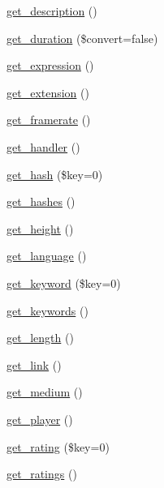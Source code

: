 \begin{DoxyCompactItemize}
\item 
\hyperlink{class_simple_pie___enclosure_abc502740b7d87d45d352ea2155667c78}{get\-\_\-description} ()
\item 
\hyperlink{class_simple_pie___enclosure_ab144c0c8ef5a4f78a343f3d436d50762}{get\-\_\-duration} (\$convert=false)
\item 
\hyperlink{class_simple_pie___enclosure_a4b640b047bf716db46b2cece32cfcf62}{get\-\_\-expression} ()
\item 
\hyperlink{class_simple_pie___enclosure_acf7e73ec3366ee8a8d4b223441837088}{get\-\_\-extension} ()
\item 
\hyperlink{class_simple_pie___enclosure_a68fde4879f5f208e7df68a165751a015}{get\-\_\-framerate} ()
\item 
\hyperlink{class_simple_pie___enclosure_ab00e7fa2386b201f2536441250da52db}{get\-\_\-handler} ()
\item 
\hyperlink{class_simple_pie___enclosure_aaab506eee67090b84410f648374572e3}{get\-\_\-hash} (\$key=0)
\item 
\hyperlink{class_simple_pie___enclosure_ad0ee7ea83fe108685560e77b87b61477}{get\-\_\-hashes} ()
\item 
\hyperlink{class_simple_pie___enclosure_a5af6b6ffc9d0d92e40bb4583d417232d}{get\-\_\-height} ()
\item 
\hyperlink{class_simple_pie___enclosure_a52e77af9a324c369cad1d69fd6a28251}{get\-\_\-language} ()
\item 
\hyperlink{class_simple_pie___enclosure_a10175514c2e4036b96b97f14db176919}{get\-\_\-keyword} (\$key=0)
\item 
\hyperlink{class_simple_pie___enclosure_a35b1c19b519145bdf80c9fc56c3cd3b3}{get\-\_\-keywords} ()
\item 
\hyperlink{class_simple_pie___enclosure_ac6a59eab49c56cb89f9c940b9fafb423}{get\-\_\-length} ()
\item 
\hyperlink{class_simple_pie___enclosure_aa0cc580fcb4ee20268343498661427fd}{get\-\_\-link} ()
\item 
\hyperlink{class_simple_pie___enclosure_ac35df32de819e5dcbf909ef5ce620da6}{get\-\_\-medium} ()
\item 
\hyperlink{class_simple_pie___enclosure_ad6fee33539962fd90a74414425c2465a}{get\-\_\-player} ()
\item 
\hyperlink{class_simple_pie___enclosure_a8a7911779acb94dd0ba40e63207971cf}{get\-\_\-rating} (\$key=0)
\item 
\hyperlink{class_simple_pie___enclosure_ad35715afd0098f4088bab6a3696c6a2d}{get\-\_\-ratings} ()

\end{DoxyCompactItemize}
